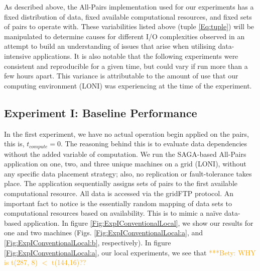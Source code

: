 \documentclass{rspublic}
\newcommand{\betynote}[1]{ {\textcolor{orange} { ***Bety: #1 }}}
\begin{document}
As described above, the All-Pairs implementation used for our
experiments has a fixed distribution of data, fixed available
computational resources, and fixed sets of pairs to operate with.
These variabilities listed above (tuple \ref{Eq:tuple}) will be
manipulated to determine causes for different I/O complexities observed
in an attempt to build an understanding of issues that arise when
utilising data-intensive applications. It is also notable that the
following experiments were consistent and reproducible for a given time,
but could vary if run more than a few hours apart. This variance is
attributable to the amount of use that our computing environment (LONI)
was experiencing at the time of the experiment.

\subsection{Experiment I: Baseline Performance}
 In the first experiment, we have no actual operation begin applied on
the pairs, this is, $t_{compute}=0$. The reasoning behind this is to
evaluate data dependencies without the added variable of computation.
We run the SAGA-based All-Pairs application on one, two, and three
unique machines on a grid (LONI), without any specific data placement
strategy; also, no replication or fault-tolerance takes place. The
application sequentially assigns sets of pairs to the first available
computational resource. All data is accessed via the gridFTP protocol.
An important fact to notice is the essentially random mapping of data
sets to computational resources based on availability. This is to mimic
a naïve data-based application. In figure
\ref{Fig:ExpIConventionalLocal}, we show our results for one and two
machines (Figs. \ref{Fig:ExpIConventionalLocal:a}, and
\ref{Fig:ExpIConventionalLocal:b}, respectively). In figure
\ref{Fig:ExpIConventionalLocal:a}, our local experiments, we see that
\betynote{WHY is t(287, 8) $<$ t(144,16)??} 
\end{document}
